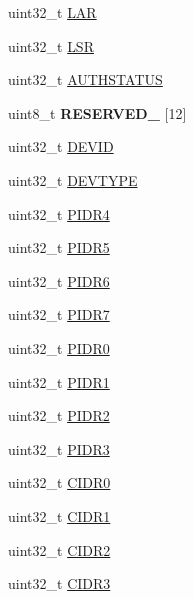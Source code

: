 \begin{DoxyCompactItemize}
\item 
uint32\+\_\+t \hyperlink{struct_e_t_b___mem_map_ae5221e565fed13a5f544c207c5f18843}{L\+A\+R}
\item 
uint32\+\_\+t \hyperlink{struct_e_t_b___mem_map_a92be1954eec6c20cefd3f7a2ea2fc2b7}{L\+S\+R}
\item 
uint32\+\_\+t \hyperlink{struct_e_t_b___mem_map_a446ff3dd57fdb7ef19dcb892d05455a7}{A\+U\+T\+H\+S\+T\+A\+T\+U\+S}
\item 
\hypertarget{struct_e_t_b___mem_map_af0ff1bd915ef05b63b6dd9853bef0d4b}{}uint8\+\_\+t {\bfseries R\+E\+S\+E\+R\+V\+E\+D\+\_} \mbox{[}12\mbox{]}\label{struct_e_t_b___mem_map_af0ff1bd915ef05b63b6dd9853bef0d4b}

\item 
uint32\+\_\+t \hyperlink{struct_e_t_b___mem_map_a135d6824f41332aa21abb897832a19a4}{D\+E\+V\+I\+D}
\item 
uint32\+\_\+t \hyperlink{struct_e_t_b___mem_map_a7c8b85bd88e8e639a4a75216ab918c88}{D\+E\+V\+T\+Y\+P\+E}
\item 
uint32\+\_\+t \hyperlink{struct_e_t_b___mem_map_aab4e4aba29d9ec426e0f2e218903a4f0}{P\+I\+D\+R4}
\item 
uint32\+\_\+t \hyperlink{struct_e_t_b___mem_map_a29dbd40dd92aaf2fc1674f9f38ef1a5e}{P\+I\+D\+R5}
\item 
uint32\+\_\+t \hyperlink{struct_e_t_b___mem_map_aa7b42abfbe48ecbae7727e614304f2e5}{P\+I\+D\+R6}
\item 
uint32\+\_\+t \hyperlink{struct_e_t_b___mem_map_afe2e7e50c2713a52cce9a89e6dcb0e1c}{P\+I\+D\+R7}
\item 
uint32\+\_\+t \hyperlink{struct_e_t_b___mem_map_a7cca8cc873dc51b739a8f2a26b01cd22}{P\+I\+D\+R0}
\item 
uint32\+\_\+t \hyperlink{struct_e_t_b___mem_map_a608af25e75d3f8e98b484e53c286aaed}{P\+I\+D\+R1}
\item 
uint32\+\_\+t \hyperlink{struct_e_t_b___mem_map_a29cf14afb49d11bc1c1ab4df4b9b23f5}{P\+I\+D\+R2}
\item 
uint32\+\_\+t \hyperlink{struct_e_t_b___mem_map_aca8df6dc059f2ca8eb432f2f74a09149}{P\+I\+D\+R3}
\item 
uint32\+\_\+t \hyperlink{struct_e_t_b___mem_map_a084d9f4d6b483f57a07d844cf1bf18d7}{C\+I\+D\+R0}
\item 
uint32\+\_\+t \hyperlink{struct_e_t_b___mem_map_afc0480cceefc94fc8b2e730bb04cfd4f}{C\+I\+D\+R1}
\item 
uint32\+\_\+t \hyperlink{struct_e_t_b___mem_map_a21c4d78f89b6495cdcd781c34f483f42}{C\+I\+D\+R2}
\item 
uint32\+\_\+t \hyperlink{struct_e_t_b___mem_map_a54c5d31e149764075338797e0705a826}{C\+I\+D\+R3}
\end{DoxyCompactItemize}


